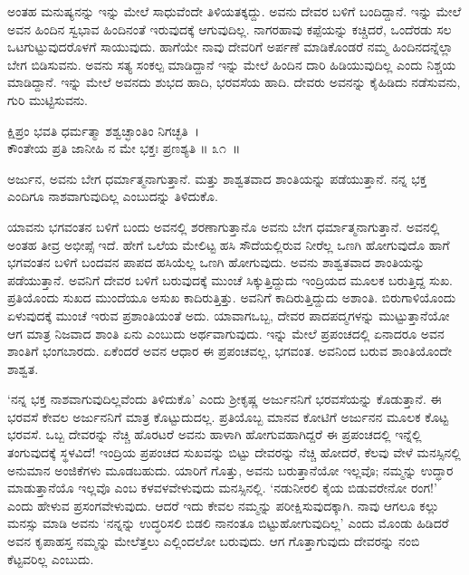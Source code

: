 ಅಂತಹ ಮನುಷ್ಯನನ್ನು ಇನ್ನು ಮೇಲೆ ಸಾಧುವೆಂದೇ ತಿಳಿಯತಕ್ಕದ್ದು. ಅವನು ದೇವರ ಬಳಿಗೆ ಬಂದಿದ್ದಾನೆ. ಇನ್ನು ಮೇಲೆ ಅವನ ಹಿಂದಿನ ಸ್ವಭಾವ ಹಿಂದಿನಂತೆ ಇರುವುದಕ್ಕೆ ಆಗುವುದಿಲ್ಲ. ನಾಗರಹಾವು ಕಪ್ಪೆಯನ್ನು ಕಚ್ಚಿದರೆ, ಒಂದೆರಡು ಸಲ ಒಟಗುಟ್ಟುವುದರೊಳಗೆ ಸಾಯುವುದು. ಹಾಗೆಯೇ ನಾವು ದೇವರಿಗೆ ಅರ್ಪಣೆ ಮಾಡಿಕೊಂಡರೆ ನಮ್ಮ ಹಿಂದಿನದನ್ನೆಲ್ಲಾ ಬೇಗ ಬಿಡಿಸುವನು. ಅವನು ಸತ್ಯ ಸಂಕಲ್ಪ ಮಾಡಿದ್ದಾನೆ ಇನ್ನು ಮೇಲೆ ಹಿಂದಿನ ದಾರಿ ಹಿಡಿಯುವುದಿಲ್ಲ ಎಂದು ನಿಶ್ಚಯ ಮಾಡಿದ್ದಾನೆ. ಇನ್ನು ಮೇಲೆ ಅವನದು ಶುಭದ ಹಾದಿ, ಭರವಸೆಯ ಹಾದಿ. ದೇವರು ಅವನನ್ನು ಕೈಹಿಡಿದು ನಡೆಸುವನು, ಗುರಿ ಮುಟ್ಟಿಸುವನು.

\begin{shloka}
ಕ್ಷಿಪ್ರಂ ಭವತಿ ಧರ್ಮತ್ಮಾ ಶಶ್ವಚ್ಛಾಂತಿಂ ನಿಗಚ್ಛತಿ~।\\ಕೌಂತೇಯ ಪ್ರತಿ ಜಾನೀಹಿ ನ ಮೇ ಭಕ್ತಃ ಪ್ರಣಶ್ಯತಿ \hfill॥ ೩೧~॥
\end{shloka}

\begin{artha}
ಅರ್ಜುನ, ಅವನು ಬೇಗ ಧರ್ಮಾತ್ಮನಾಗುತ್ತಾನೆ. ಮತ್ತು ಶಾಶ್ವತವಾದ ಶಾಂತಿಯನ್ನು ಪಡೆಯುತ್ತಾನೆ. ನನ್ನ ಭಕ್ತ ಎಂದಿಗೂ ನಾಶವಾಗುವುದಿಲ್ಲ ಎಂಬುದನ್ನು ತಿಳಿದುಕೊ.
\end{artha}

ಯಾವನು ಭಗವಂತನ ಬಳಿಗೆ ಬಂದು ಅವನಲ್ಲಿ ಶರಣಾಗುತ್ತಾನೊ ಅವನು ಬೇಗ ಧರ್ಮಾತ್ಮ\-ನಾಗುತ್ತಾನೆ. ಅವನಲ್ಲಿ ಅಂತಹ ತೀವ್ರ ಅಭೀಪ್ಸೆ ಇದೆ. ಹೇಗೆ ಒಲೆಯ ಮೇಲಿಟ್ಟ ಹಸಿ ಸೌದೆಯಲ್ಲಿರುವ ನೀರೆಲ್ಲ ಒಣಗಿ ಹೋಗುವುದೊ ಹಾಗೆ ಭಗವಂತನ ಬಳಿಗೆ ಬಂದವನ ಪಾಪದ ಹಸಿಯೆಲ್ಲ ಒಣಗಿ ಹೋಗುವುದು. ಅವನು ಶಾಶ್ವತವಾದ ಶಾಂತಿಯನ್ನು ಪಡೆಯುತ್ತಾನೆ. ಅವನಿಗೆ ದೇವರ ಬಳಿಗೆ ಬರುವುದಕ್ಕೆ ಮುಂಚೆ ಸಿಕ್ಕುತ್ತಿದ್ದುದು ಇಂದ್ರಿಯದ ಮೂಲಕ ಬರುತ್ತಿದ್ದ ಸುಖ. ಪ್ರತಿಯೊಂದು ಸುಖದ ಮುಂದೆಯೂ ಅಸುಖ ಕಾದಿರುತ್ತಿತ್ತು. ಅವನಿಗೆ ಕಾದಿರುತ್ತಿದ್ದುದು ಅಶಾಂತಿ. ಬಿರುಗಾಳಿಯೊಂದು ಏಳುವುದಕ್ಕೆ ಮುಂಚೆ ಇರುವ ಪ್ರಶಾಂತಿಯಂತೆ ಅದು. ಯಾವಾಗ\break ಒಬ್ಬ, ದೇವರ ಪಾದಪದ್ಮಗಳನ್ನು ಮುಟ್ಟುತ್ತಾನೆಯೋ ಆಗ ಮಾತ್ರ ನಿಜವಾದ ಶಾಂತಿ ಏನು ಎಂಬುದು ಅರ್ಥವಾಗುವುದು. ಇನ್ನು ಮೇಲೆ ಪ್ರಪಂಚದಲ್ಲಿ ಏನಾದರೂ ಅವನ ಶಾಂತಿಗೆ ಭಂಗಬಾರದು. ಏಕೆಂದರೆ ಅವನ ಆಧಾರ ಈ ಪ್ರಪಂಚವಲ್ಲ, ಭಗವಂತ. ಅವನಿಂದ ಬರುವ ಶಾಂತಿಯೊಂದೇ ಶಾಶ್ವತ.

‘ನನ್ನ ಭಕ್ತ ನಾಶವಾಗುವುದಿಲ್ಲವೆಂದು ತಿಳಿದುಕೊ’ ಎಂದು ಶ‍್ರೀಕೃಷ್ಣ ಅರ್ಜುನನಿಗೆ ಭರವಸೆಯನ್ನು ಕೊಡುತ್ತಾನೆ. ಈ ಭರವಸೆ ಕೇವಲ ಅರ್ಜುನನಿಗೆ ಮಾತ್ರ ಕೊಟ್ಟುದುದಲ್ಲ. ಪ್ರತಿಯೊಬ್ಬ ಮಾನವ ಕೋಟಿಗೆ ಅರ್ಜುನನ ಮೂಲಕ ಕೊಟ್ಟ ಭರವಸೆ. ಒಬ್ಬ ದೇವರನ್ನು ನೆಚ್ಚಿ ಹೊರಟರೆ ಅವನು ಹಾಳಾಗಿ ಹೋಗುವಹಾಗಿದ್ದರೆ ಈ ಪ್ರಪಂಚದಲ್ಲಿ ಇನ್ನೆಲ್ಲಿ ತಂಗುವುದಕ್ಕೆ ಸ್ಥಳವಿದೆ! ಇಂದ್ರಿಯ ಪ್ರಪಂಚದ ಸುಖವನ್ನು ಬಿಟ್ಟು ದೇವರನ್ನು ನೆಚ್ಚಿ ಹೋದರೆ, ಕೆಲವು ವೇಳೆ ಮನಸ್ಸಿನಲ್ಲಿ ಅನುಮಾನ ಅಂಜಿಕೆಗಳು ಮೂಡಬಹುದು. ಯಾರಿಗೆ ಗೊತ್ತು, ಅವನು ಬರುತ್ತಾನೆಯೋ ಇಲ್ಲವೊ; ನಮ್ಮನ್ನು ಉದ್ಧಾರ ಮಾಡುತ್ತಾನೆಯೊ ಇಲ್ಲವೊ ಎಂಬ ಕಳವಳವೇಳುವುದು ಮನಸ್ಸಿನಲ್ಲಿ. ‘ನಡುನೀರಲಿ ಕೈಯ ಬಿಡುವರೇನೋ ರಂಗ!’ ಎಂದು ಹೇಳುವ ಪ್ರಸಂಗವೇಳುವುದು. ಆದರೆ ಇದು ಕೇವಲ ನಮ್ಮನ್ನು ಪರೀಕ್ಷಿಸುವುದಕ್ಕಾಗಿ. ನಾವು ಆಗಲೂ ಕಲ್ಲು ಮನಸ್ಸು ಮಾಡಿ ಅವನು ‘ನನ್ನನ್ನು ಉದ್ಧರಿಸಲಿ ಬಿಡಲಿ ನಾನಂತೂ ಬಿಟ್ಟುಹೋಗುವುದಿಲ್ಲ’ ಎಂದು ಮೊಂಡು ಹಿಡಿದರೆ ಅವನ ಕೃಪಾಹಸ್ತ ನಮ್ಮನ್ನು ಮೇಲೆತ್ತಲು ಎಲ್ಲಿಂದಲೋ ಬರುವುದು. ಆಗ ಗೊತ್ತಾಗುವುದು ದೇವರನ್ನು ನಂಬಿ ಕೆಟ್ಟವರಿಲ್ಲ ಎಂಬುದು.

